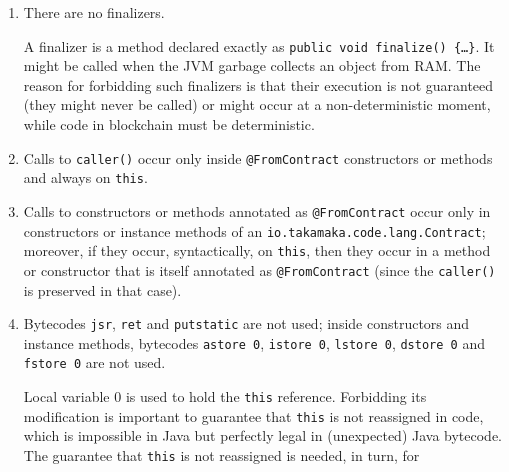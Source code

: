 \begin{enumerate}
\begin{commentbox}
of the class. The reason for forbidding such static initializers is that,
inside Takamaka, they would end up being run many times, at each transaction
that uses the class, and reset the static state of a class,
since static fields are not kept in blockchain.
This is a significant divergence from the expected
semantics of Java, that requires static initialization of a class to
occur only once during the lifetime of that class. Note that the absence of
static initializers still allows a class to have static fields, as long as
they are bound to constant primitive or \texttt{String} values.
\end{commentbox}
%
\item There are no finalizers.
%
\begin{commentbox}
A finalizer is a method declared exactly as
\texttt{public void finalize() \{\ldots\}}. It might be called
when the JVM garbage collects an object from RAM.
The reason for forbidding such finalizers is that
their execution is not guaranteed (they might never be called)
or might occur at a non-deterministic moment,
while code in blockchain must be deterministic.
\end{commentbox}
%
\item\label{check:caller_correct_usage} Calls to \texttt{caller()}
	occur only inside \texttt{@FromContract} constructors or methods
	and always on \texttt{this}.
\item Calls to constructors or methods annotated as \texttt{@FromContract} occur
	only in constructors or instance methods of an
	\texttt{io.takamaka.code.lang.Contract}; moreover, if they occur, syntactically,
	on \texttt{this}, then they occur in a method or constructor that is itself
	annotated as \texttt{@FromContract} (since the \texttt{caller()} is preserved in that case).
\item Bytecodes \texttt{jsr}, \texttt{ret} and \texttt{putstatic} are not used; inside constructors and instance
	methods, bytecodes \texttt{astore 0}, \texttt{istore 0}, \texttt{lstore 0}, \texttt{dstore 0} and
	\texttt{fstore 0} are not used.
%
\begin{commentbox}
Local variable 0 is used to hold the \texttt{this} reference. Forbidding its modification
is important to guarantee that \texttt{this} is not reassigned in code, which is impossible
in Java but perfectly legal in (unexpected) Java bytecode.
The guarantee that \texttt{this} is not reassigned is needed, in turn, for

\end{commentbox}
\end{enumerate}
